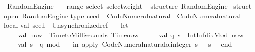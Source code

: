 \begin{isabellebody}
\isamarkupfalse%
%
\endisatagproof
{\isafoldproof}%
%
\isadelimproof
\isanewline
%
\endisadelimproof
\isanewline
{}\isamarkupfalse%
%
\isadelimdocument
%
\endisadelimdocument
%
\isatagdocument
%
\isamarkuptrue%
%
\endisatagdocument
{\isafolddocument}%
%
\isadelimdocument
%
\endisadelimdocument
{}\isamarkupfalse%
\ Random{\isacharunderscore}{\kern0pt}Engine\isanewline
\ \ \ range\ select\ select{\isacharunderscore}{\kern0pt}weight\isanewline
%
\isadelimML
\isanewline
%
\endisadelimML
%
\isatagML
{}\isamarkupfalse%
\ {\isacartoucheopen}\isanewline
structure\ Random{\isacharunderscore}{\kern0pt}Engine\ {\isacharequal}{\kern0pt}\isanewline
struct\isanewline
\isanewline
open\ Random{\isacharunderscore}{\kern0pt}Engine{\isacharsemicolon}{\kern0pt}\isanewline
\isanewline
type\ seed\ {\isacharequal}{\kern0pt}\ Code{\isacharunderscore}{\kern0pt}Numeral{\isachardot}{\kern0pt}natural\ {\isacharasterisk}{\kern0pt}\ Code{\isacharunderscore}{\kern0pt}Numeral{\isachardot}{\kern0pt}natural{\isacharsemicolon}{\kern0pt}\isanewline
\isanewline
local\isanewline
\isanewline
val\ seed\ {\isacharequal}{\kern0pt}\ Unsynchronized{\isachardot}{\kern0pt}ref\ \isanewline
\ \ {\isacharparenleft}{\kern0pt}let\isanewline
\ \ \ \ val\ now\ {\isacharequal}{\kern0pt}\ Time{\isachardot}{\kern0pt}toMilliseconds\ {\isacharparenleft}{\kern0pt}Time{\isachardot}{\kern0pt}now\ {\isacharparenleft}{\kern0pt}{\isacharparenright}{\kern0pt}{\isacharparenright}{\kern0pt}{\isacharsemicolon}{\kern0pt}\isanewline
\ \ \ \ val\ {\isacharparenleft}{\kern0pt}q{\isacharcomma}{\kern0pt}\ s{}{\isacharparenright}{\kern0pt}\ {\isacharequal}{\kern0pt}\ IntInf{\isachardot}{\kern0pt}divMod\ {\isacharparenleft}{\kern0pt}now{\isacharcomma}{\kern0pt}\ {}{}{}{}{}{}{}{}{}{}{\isacharparenright}{\kern0pt}{\isacharsemicolon}{\kern0pt}\isanewline
\ \ \ \ val\ s{}\ {\isacharequal}{\kern0pt}\ q\ mod\ {}{}{}{}{}{}{}{}{}{}{\isacharsemicolon}{\kern0pt}\isanewline
\ \ in\ apply{}\ Code{\isacharunderscore}{\kern0pt}Numeral{\isachardot}{\kern0pt}natural{\isacharunderscore}{\kern0pt}of{\isacharunderscore}{\kern0pt}integer\ {\isacharparenleft}{\kern0pt}s{}\ {\isacharplus}{\kern0pt}\ {}{\isacharcomma}{\kern0pt}\ s{}\ {\isacharplus}{\kern0pt}\ {}{\isacharparenright}{\kern0pt}\ end{\isacharparenright}{\kern0pt}{\isacharsemicolon}{\kern0pt}\isanewline

\end{isabellebody}
